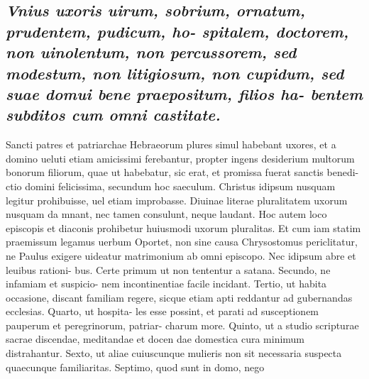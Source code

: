 \documentclass{article}
\begin{document}
\begin{pages}
\subsection*{\textit{Vnius uxoris uirum, sobrium, ornatum, prudentem, pudicum, ho- spitalem, doctorem, non uinolentum, non percussorem, sed modestum, non litigiosum, non cupidum, sed suae domui bene praepositum, filios ha- bentem subditos cum omni castitate. }}\pstart Sancti patres et patriarchae Hebraeorum plures simul habebant uxores, et a domino ueluti etiam amicissimi ferebantur, propter ingens desiderium multorum bonorum filiorum, quae ut habebatur, sic erat, et promissa fuerat sanctis benedi- ctio domini felicissima, secundum hoc saeculum. Christus idipsum nusquam legitur prohibuisse, uel etiam improbasse. Diuinae literae pluralitatem uxorum nusquam da mnant, nec tamen consulunt, neque laudant. Hoc autem loco episcopis et diaconis prohibetur huiusmodi uxorum pluralitas. Et cum iam statim praemissum legamus uerbum Oportet, non sine causa Chrysostomus periclitatur, ne Paulus exigere uideatur matrimonium ab omni episcopo. Nec idipsum abre et leuibus rationi- bus. Certe primum ut non tententur a satana. Secundo, ne infamiam et suspicio- nem incontinentiae facile incidant. Tertio, ut habita occasione, discant familiam regere, sicque etiam apti reddantur ad gubernandas ecclesias. Quarto, ut hospita- les esse possint, et parati ad susceptionem pauperum et peregrinorum, patriar- charum more. Quinto, ut a studio scripturae sacrae discendae, meditandae et docen dae domestica cura minimum distrahantur. Sexto, ut aliae cuiuscunque mulieris non sit necessaria suspecta quaecunque familiaritas. Septimo, quod sunt in domo, nego  \pend

\end{pages}
\end{document}
